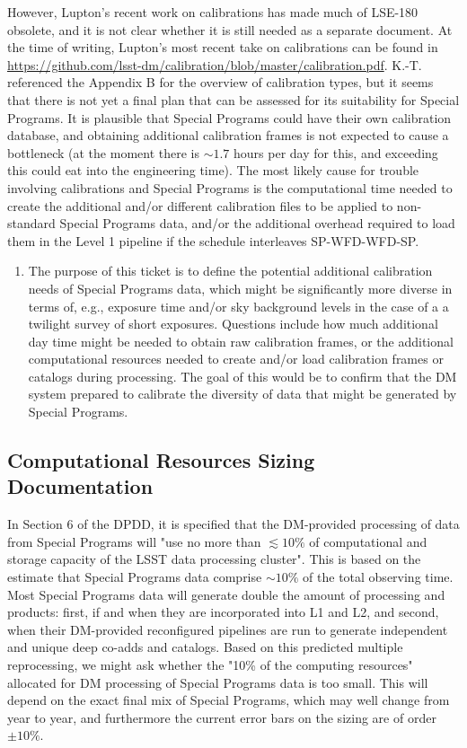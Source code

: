 \documentclass[DM,lsstdraft,toc]{lsstdoc}
\begin{document}
However, Lupton's recent work on calibrations has made much of LSE-180 obsolete, and it is not clear whether it is still needed as a separate document. At the time of writing, Lupton's most recent take on calibrations can be found in \url{https://github.com/lsst-dm/calibration/blob/master/calibration.pdf}. K.-T. referenced the Appendix B for the overview of calibration types, but it seems that there is not yet a final plan that can be assessed for its suitability for Special Programs. It is plausible that Special Programs could have their own calibration database, and obtaining additional calibration frames is not expected to cause a bottleneck (at the moment there is $\sim1.7$ hours per day for this, and exceeding this could eat into the engineering time). The most likely cause for trouble involving calibrations and Special Programs is the computational time needed to create the additional and/or different calibration files to be applied to non-standard Special Programs data, and/or the additional overhead required to load them in the Level 1 pipeline if the schedule interleaves SP-WFD-WFD-SP.

\begin{enumerate}[resume,topsep=-10pt,label= \textbf{Action \Roman*}] \item \label{Cal-1} The purpose of this ticket is to define the potential additional calibration needs of Special Programs data, which might be significantly more diverse in terms of, e.g., exposure time and/or sky background levels in the case of a a twilight survey of short exposures. Questions include how much additional day time might be needed to obtain raw calibration frames, or the additional computational resources needed to create and/or load calibration frames or catalogs during processing. The goal of this would be to confirm that the DM system prepared to calibrate the diversity of data that might be generated by Special Programs. \end{enumerate}

\subsection{Computational Resources Sizing Documentation}\label{ssec:docrev_sizing}

In Section 6 of the DPDD, it is specified that the DM-provided processing of data from Special Programs will "use no more than $\lesssim10\%$ of computational and storage capacity of the LSST data processing cluster". This is based on the estimate that Special Programs data comprise $\sim10\%$ of the total observing time. Most Special Programs data will generate double the amount of processing and products: first, if and when they are incorporated into L1 and L2, and second, when their DM-provided reconfigured pipelines are run to generate independent and unique deep co-adds and catalogs. Based on this predicted multiple reprocessing, we might ask whether the "10\% of the computing resources" allocated for DM processing of Special Programs data is too small. This will depend on the exact final mix of Special Programs, which may well change from year to year, and furthermore the current error bars on the sizing are of order $\pm10\%$.
\end{document}
